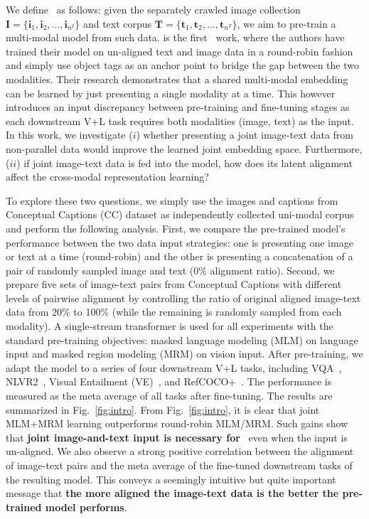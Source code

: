 We define \TaskName~as follows: 
given the separately crawled image collection $\mathbf I = \{\mathbf i_1, \mathbf i_2, \dots, \mathbf i_{n^I}\}$ and text corpus $\mathbf T = \{\mathbf t_1, \mathbf t_2, \dots, \mathbf t_{n^T}\}$, we aim to pre-train a multi-modal model from such data.
\uvisualbert \cite{li2020unsupervised} is the first \TaskName~work, where the authors have trained their model on un-aligned text and image data in a round-robin fashion and simply use object tags as an anchor point to bridge the gap between the two modalities. 
Their research demonstrates that a shared multi-modal embedding can be learned by just presenting a single modality at a time.
This however introduces an input discrepancy between pre-training and fine-tuning stages as each downstream V+L task requires both modalities (image, text) as the input. 
In this work, we investigate ($i$) whether presenting a joint image-text data from non-parallel data  would improve the learned joint embedding space.
Furthermore, ($ii$) if joint image-text data is fed into the model, how does its latent alignment affect the cross-modal representation learning? 

To explore these two questions, we simply use the images and captions from Conceptual Captions (CC) dataset \cite{sharma2018conceptual} as independently collected uni-modal corpus and perform the following analysis.
First, we compare the pre-trained model's performance between the two data input strategies:
one is presenting one image or text at a time (round-robin) and the other is presenting a concatenation of a pair of randomly sampled image and text (0\% alignment ratio). 
Second, we prepare five sets of image-text pairs from Conceptual Captions with different levels of pairwise alignment by controlling the ratio of original aligned image-text data from 20\% to 100\% (while the remaining is randomly sampled from each modality). 
A single-stream transformer is used for all experiments with the standard pre-training objectives: masked language modeling (MLM) on language input and masked region modeling (MRM) on vision input. After pre-training, we adapt the model to a series of four downstream V+L tasks, including VQA~\cite{antol2015vqa}, NLVR2~\cite{suhr2018corpus}, Visual Entailment (VE)~\cite{xie2019visual}, and RefCOCO+~\cite{yu2016modeling}. 
The performance is measured as the meta average of all tasks after fine-tuning. 
The results are summarized in Fig.~\ref{fig:intro}. 
From Fig.~\ref{fig:intro}, it is clear that joint MLM+MRM learning outperforms
round-robin MLM/MRM. 
Such gains show that \textbf{joint image-and-text input is necessary for \TaskName}~even when the input is un-aligned. 
We also observe a strong positive correlation between the alignment of image-text pairs and the meta average of the fine-tuned downstream tasks of the resulting model. 
This conveys a seemingly intuitive but quite important message that \textbf{the more aligned the image-text data is the better the pre-trained model performs}. 

